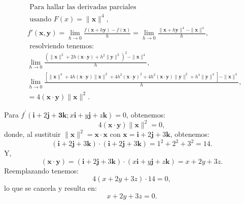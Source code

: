 \documentclass{report}
\begin{document}
    \[
    \begin{aligned}
    & \text { Para hallar las derivadas parciales } \\
    & \text { usando } F(x)=\| \boldsymbol{x}\|^{4}, \\
    & f'(\boldsymbol{x}, \boldsymbol{y})=\lim _{h \to 0} \frac{f(\boldsymbol{x}+h\boldsymbol{y})-f(\boldsymbol{x})}{h}=\lim _{h \to 0} \frac{\| \boldsymbol{x}+h \boldsymbol{y}\|^{4}-\| \boldsymbol{x}\|^{4}}{h}, \\
    & \text { resolviendo tenemos:}\\
    & \lim _{h \to 0} \frac{\left(\| \boldsymbol{x}\|^{2}+2h(\boldsymbol{x} \cdot \boldsymbol{y})+h^{2}\|\boldsymbol{y}\|^{2}\right)^{2} - \| \boldsymbol{x}\|^{4}}{h}, \\
    & \lim _{h \to 0} \frac{\left[ \| \boldsymbol{x}\|^{4} + 4h (\boldsymbol{x} \cdot \boldsymbol{y})\|\boldsymbol{x}\|^{2} + 4h^2(\boldsymbol{x} \cdot \boldsymbol{y})^{2} + 4h^2(\boldsymbol{x} \cdot \boldsymbol{y})\|\boldsymbol{y}\|^{2} + h^4 \|\boldsymbol{y}\|^{4} \right] - \| \boldsymbol{x}\|^{4}}{h}, \\
    & =4 (\boldsymbol{x} \cdot \boldsymbol{y}) \| \boldsymbol{x}\|^{2}.
    \end{aligned}
    \]

    Para $f^{\prime}(\boldsymbol{i}+2 \boldsymbol{j}+\mathbf{3 k}; x \boldsymbol{i}+y \boldsymbol{j}+z \boldsymbol{k})=0$, obtenemos:
    \[
    4(\boldsymbol{x} \cdot \boldsymbol{y}) \|\boldsymbol{x}\|^{2}=0,
    \]
    donde, al sustituir $\| \boldsymbol{x}\|^{2} = \boldsymbol{x} \cdot \boldsymbol{x}$ con $\boldsymbol{x} = \boldsymbol{i} + 2\boldsymbol{j} + 3\boldsymbol{k}$, obtenemos:
    \[
    (\boldsymbol{i} + 2\boldsymbol{j} + 3\boldsymbol{k}) \cdot (\boldsymbol{i} + 2\boldsymbol{j} + 3\boldsymbol{k}) = 1^2 + 2^2 + 3^2 = 14.
    \]
    Y,
    \[
    (\boldsymbol{x} \cdot \boldsymbol{y}) = (\boldsymbol{i} + 2\boldsymbol{j} + 3\boldsymbol{k}) \cdot (x\boldsymbol{i} + y\boldsymbol{j} + z\boldsymbol{k}) = x + 2y + 3z.
    \]
    Reemplazando tenemos:
    \[
    4(x + 2y + 3z) \cdot 14 = 0,
    \]
    lo que se cancela y resulta en:
    \[
    x + 2y + 3z = 0.
    \]
\end{document}
